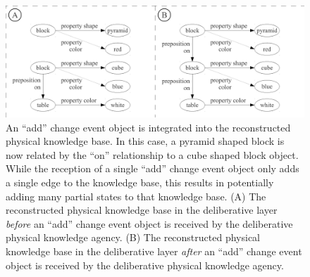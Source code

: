 \begin{figure}
\centering
\includegraphics[width=12cm]{gfx/relationship_partial_state_abstraction_add}
\caption[An ``add'' change event object is integrated into the
  reconstructed physical knowledge base.]{An ``add'' change event
  object is integrated into the reconstructed physical knowledge base.
  In this case, a pyramid shaped block is now related by the ``on''
  relationship to a cube shaped block object.  While the reception of
  a single ``add'' change event object only adds a single edge to the
  knowledge base, this results in potentially adding many partial
  states to that knowledge base.  (A) The reconstructed physical
  knowledge base in the deliberative layer \emph{before} an ``add''
  change event object is received by the deliberative physical
  knowledge agency.  (B) The reconstructed physical knowledge base in
  the deliberative layer \emph{after} an ``add'' change event object
  is received by the deliberative physical knowledge agency.}
\label{figure:relationship_partial_state_abstraction_add}
\end{figure}


